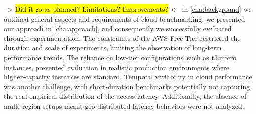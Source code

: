 --> \hl{Did it go as planned? Limitations? Improvements?} <--
In \cref{cha:background} we outlined general aspects and requirements of cloud benchmarking, we presented our approach in \cref{cha:approach}, and consequently we successfully evaluated through experimentation. The constraints of the AWS Free Tier restricted the duration and scale of experiments, limiting the observation of long-term performance trends. The reliance on low-tier configurations, such as t3.micro instances, prevented evaluation in realistic production environments where higher-capacity instances are standard. Temporal variability in cloud performance was another challenge, with short-duration benchmarks potentially not capturing the real empirical distribution of the access latency. Additionally, the absence of multi-region setups meant geo-distributed latency behaviors were not analyzed.
